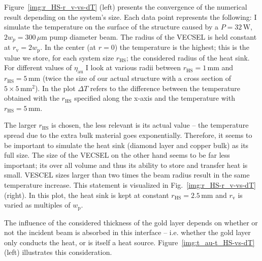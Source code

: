Figure~\ref{img:r_HS-r_v-vs-dT} (left) presents
the convergence of the numerical result
depending on the system's size.
Each data point represents the following:
I simulate the temperature
on the surface of the structure
caused by a $P=32\,\mathrm{W}$,
$2w_p=300\,\mu\mathrm{m}$ pump diameter beam.
The radius of the VECSEL
is held constant at
$r_\mathrm{v}=2w_\mathrm{p}$.
In the center (at $r=0$)
the temperature is the highest;
this is the value we store,
for each system size $r_\mathrm{HS}$;
the considered radius of the heat sink.
For different values of $\eta_\mathrm{au}$
I look at various radii between
$r_\mathrm{HS}=1\,\mathrm{mm}$
and $r_\mathrm{HS}=5\,\mathrm{mm}$
(twice the size of our actual structure
with a cross section of $5\times5\,\mathrm{mm}^2$).
In the plot $\Delta T$ refers to the difference
between the temperature obtained with
the $r_\mathrm{HS}$ specified along the x-axis
and the temperature with $r_\mathrm{HS}=5\,\mathrm{mm}$.

The larger $r_\mathrm{HS}$ is chosen,
the less relevant is its actual value --
the temperature spread due to the extra bulk material
goes exponentially.
Therefore,
it seems to be important
to simulate the heat sink
(diamond layer and copper bulk)
as its full size.
The size of the VECSEL on the other hand
seems to be far less important;
its over all volume
and thus its ability to store and transfer heat
is small.
VESCEL sizes larger than two times the beam radius
result in the same temperature increase.
This statement is visualized
in Fig.~\ref{img:r_HS-r_v-vs-dT} (right).
In this plot,
the heat sink is kept
at constant $r_\mathrm{HS}=2.5\,\mathrm{mm}$ and
$r_\mathrm{v}$ is varied as multiples of $w_\mathrm{p}$.

The influence of the considered thickness of the gold layer
depends on whether or not
the incident beam is absorbed in this interface --
i.e. whether the gold layer only conducts the heat,
or is itself a heat source.
Figure~\ref{img:t_au-t_HS-vs-dT} (left)
illustrates this consideration.

